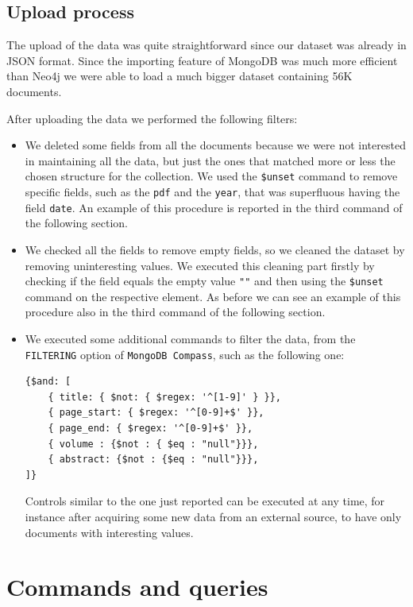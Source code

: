 \section{Upload process}
\label{sec:upload_process_mongodb}%
The upload of the data was quite straightforward since our dataset was already in JSON format.
Since the importing feature of MongoDB was much more efficient than Neo4j we were able to load a much bigger dataset containing 56K documents.

After uploading the data we performed the following filters:
\begin{itemize}
    \item We deleted some fields from all the documents because we were not interested in maintaining all the data, but just the ones that matched more or less the chosen structure for the collection.
    We used the \verb!$unset! command to remove specific fields, such as the \verb|pdf| and the \verb|year|, that was superfluous having the field \verb|date|.
    An example of this procedure is reported in the third command of the following section.
    \item We checked all the fields to remove empty fields, so we cleaned the dataset by removing uninteresting values.
    We executed this cleaning part firstly by checking if the field equals the empty value \verb|""| and then using the \verb|$unset| command on the respective element.
    As before we can see an example of this procedure also in the third command of the following section.
    \item We executed some additional commands to filter the data, from the \verb|FILTERING| option of \verb|MongoDB Compass|, such as the following one:
    \begin{lstlisting}[label={lst:filtering}]
{$and: [
    { title: { $not: { $regex: '^[1-9]' } }},
    { page_start: { $regex: '^[0-9]+$' }},
    { page_end: { $regex: '^[0-9]+$' }},
    { volume : {$not : { $eq : "null"}}},
    { abstract: {$not : {$eq : "null"}}},
]}
    \end{lstlisting}
    Controls similar to the one just reported can be executed at any time, for instance after acquiring some new data from an external source, to have only documents with interesting values.
\end{itemize}


\chapter{Commands and queries}
\label{ch:commands_and_queries_mongodb}%


